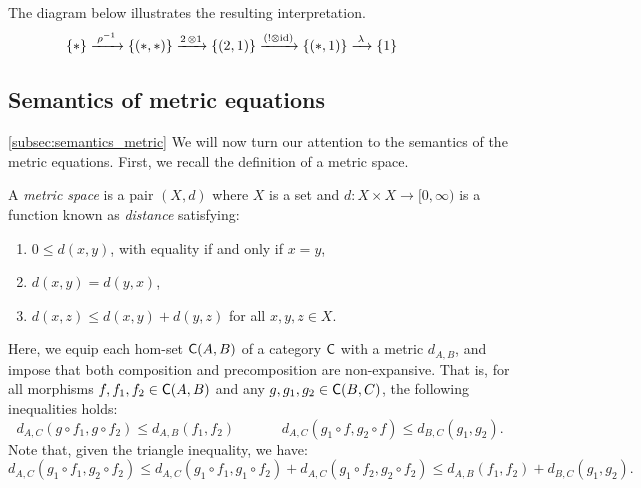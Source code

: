 \begin{example}
   The diagram below illustrates the resulting interpretation.
   \begin{align*}
   & \hspace{-40pt} & \{*\} & \xrightarrow{\hspace{2pt}\rho^{-1}\hspace{2pt}}    \{(*,*)\}  \xrightarrow{2  \, \otimes 1}   \{(2,1)\}     \xrightarrow{(! \otimes \id)} \{(*,1)\} \xrightarrow{\hspace{2pt}\lambda \hspace{2pt}} \{1\}
   \end{align*}
\end{example}


\subsection{Semantics of metric equations} \autoref{subsec:semantics_metric}
 We will now turn our attention to the semantics of the metric equations. First, we recall the definition of a metric space.

 \begin{definition}
    A \emph{metric space} is a pair $(X, d)$ where $X$ is a set and $d: X \times X \to [0, \infty)$ is a function known as \emph{distance} satisfying:
    \begin{enumerate}
        \item $0 \leq d(x, y)$, with equality if and only if $x = y$,
        \item $d(x, y) = d(y, x)$,
        \item $d(x, z) \leq d(x, y) + d(y, z)$ for all $x, y, z \in X$.
    \end{enumerate}
  \end{definition}
 
 Here, we equip each hom-set $\mathsf{C}(A, B)$ of a category $\mathsf{C}$ with a metric $d_{A,B}$, and impose that both composition and precomposition are non-expansive. That is, for all morphisms $f,f_1, f_2 \in \mathsf{C}(A, B)$ and any $g, g_1, g_2 \in \mathsf{C}(B, C)$, the following inequalities holds:
$$
d_{A,C}(g \circ f_1, g \circ f_2) \leq d_{A,B}(f_1, f_2) \hspace{40pt} d_{A,C}(g_1 \circ f, g_2 \circ f) \leq d_{B,C}(g_1, g_2).
$$
Note that, given the triangle inequality, we have:
\begin{equation*}
  d_{A,C}(g_1 \circ f_1, g_2 \circ f_2) \leq  d_{A,C}(g_1 \circ f_1, g_1 \circ f_2) + d_{A,C}(g_1 \circ f_2, g_2 \circ f_2) \leq  d_{A,B}(f_1, f_2) +   d_{B,C}(g_1, g_2).
\end{equation*}

